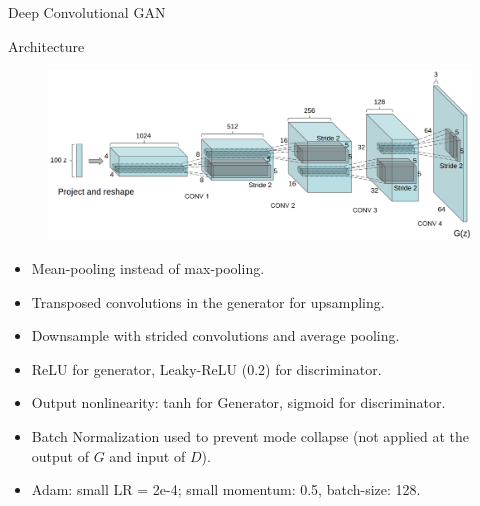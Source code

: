 \documentclass{beamer}
\begin{document}
\begin{frame}{Deep Convolutional GAN}
	\begin{block}{Architecture}
		\vspace{-0.3cm}
		\begin{figure}
			\centering
			\includegraphics[width=0.8\linewidth]{figs/dcgan_1}
		\end{figure}
	\end{block}
	\vspace{-0.4cm}
	\begin{itemize}
		\footnotesize
		\item  Mean-pooling instead of max-pooling.
		\item Transposed convolutions in the generator for upsampling.
		\item Downsample with strided convolutions and average pooling.
		\item ReLU for generator, Leaky-ReLU (0.2) for discriminator.
		\item Output nonlinearity: tanh for Generator, sigmoid for discriminator.
		\item Batch Normalization used to prevent mode collapse (not applied at the output of $G$ and input of $D$).
		\item Adam: small LR = 2e-4; small momentum: 0.5, batch-size: 128.
	\end{itemize}
\end{frame}
\end{document}
